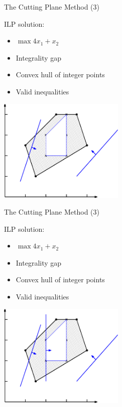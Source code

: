 \documentclass[10pt]{beamer}
\begin{document}
\begin{frame}[t]{The Cutting Plane Method (3)}
        \begin{minipage}[t]{0.48\textwidth}
            ILP solution:
            \begin{itemize}
                \item \alert{$ \max 4x_1 + x_2 $}
                \item Integrality gap
                \item Convex hull of integer points
                \item Valid inequalities
            \end{itemize}
        \end{minipage}
        \begin{minipage}[t]{0.48\textwidth}
            \begin{center}
                \includegraphics[width=6cm]{cutting_plane011.eps} 
            \end{center}
        \end{minipage}        
\end{frame}

\begin{frame}[t]{The Cutting Plane Method (3)}
        \begin{minipage}[t]{0.48\textwidth}
            ILP solution:
            \begin{itemize}
                \item \alert{$ \max 4x_1 + x_2 $}
                \item Integrality gap
                \item Convex hull of integer points
                \item Valid inequalities
            \end{itemize}
        \end{minipage}
        \begin{minipage}[t]{0.48\textwidth}
            \begin{center}
                \includegraphics[width=6cm]{cutting_plane012.eps} 
            \end{center}
        \end{minipage}        
\end{frame}
\end{document}
